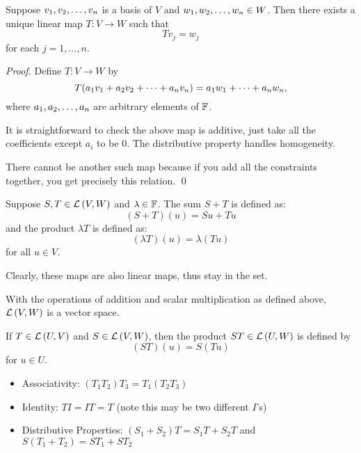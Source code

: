 \begin{theorem}
    Suppose $v_1, v_2, \ldots, v_n$ is a basis of $V$ and $w_1, w_2, \ldots, w_{n} \in W$. Then there
    exists a unique linear map $T : V \to W$ such that
    \[ Tv_j = w_j \]
    for each $j = 1, \dots, n$.

    \begin{proof}
        Define $T: V \to W$ by
        \[ T(a_1v_1 + a_2v_2 + \cdots + a_nv_n) = a_1w_1 + \dots + a_nw_n, \]
        where $a_1, a_2, \ldots, a_n$ are arbitrary elements of $\operatorname{\mathbb{F}}$.

        It is straightforward to check the above map is additive, just take all the
        coefficients except $a_i$ to be 0. The distributive property handles homogeneity.

        There cannot be another such map because if you add all the constraints
        together, you get precisely this relation. \qed
    \end{proof}
\end{theorem}

\begin{definition} 
   Suppose $S, T \in \mathcal{L} \left( V, W \right)$ and $\lambda \in \operatorname{\mathbb{F}}$. The sum $S+T$ is defined as:
   \[ (S+T)(u) = Su + Tu \]
    and the product $\lambda T$ is defined as:
    \[ (\lambda T)(u) = \lambda (Tu) \]
    for all $u \in V$.

    Clearly, these maps are also linear maps, thus stay in the set.
\end{definition}

\begin{note} 
   With the operations of addition and scalar multiplication as defined above, $\mathcal{L} \left( V, W \right)$
   is a vector space. 
\end{note}

\begin{definition} 
   If $T \in \mathcal{L} \left( U, V \right)$ and $S \in \mathcal{L} \left( V, W \right)$, then the product $ST \in \mathcal{L} \left( U, W \right)$ is defined by
   \[ (ST)(u) = S(Tu) \]
   for $u \in U$.
\end{definition}

\begin{note} 
   \begin{itemize}
       \item Associativity: $(T_1 T_2)T_3 = T_1(T_2 T_3)$
       \item Identity: $TI = IT = T$ (note this may be two different $I$'s)
       \item Distributive Properties: $(S_1 + S_2)T = S_1 T + S_2 T$ and $S(T_1 + T_2) = ST_1 + ST_2$
   \end{itemize} 
\end{note}

